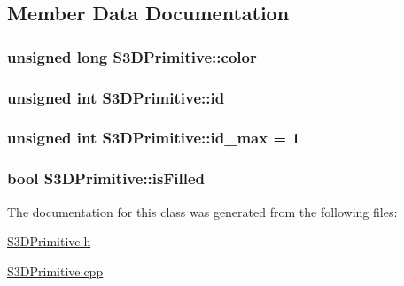 \subsection{Member Data Documentation}
\hypertarget{class_s3_d_primitive_afc81699d5253aab2757a2c5e33848a22}{
\subsubsection[{color}]{\setlength{\rightskip}{0pt plus 5cm}unsigned long {\bf S3DPrimitive::color}}}
\label{class_s3_d_primitive_afc81699d5253aab2757a2c5e33848a22}
\hypertarget{class_s3_d_primitive_ae8ff735495c481dbbd0c99ffe16d954f}{
\subsubsection[{id}]{\setlength{\rightskip}{0pt plus 5cm}unsigned int {\bf S3DPrimitive::id}}}
\label{class_s3_d_primitive_ae8ff735495c481dbbd0c99ffe16d954f}
\hypertarget{class_s3_d_primitive_a08ee26517002051f19202d8b62bf2b46}{
\subsubsection[{id\_\-max}]{\setlength{\rightskip}{0pt plus 5cm}unsigned int {\bf S3DPrimitive::id\_\-max} = 1}}
\label{class_s3_d_primitive_a08ee26517002051f19202d8b62bf2b46}
\hypertarget{class_s3_d_primitive_ae5b091719cc1afa825a4ba0e1dfce670}{
\subsubsection[{isFilled}]{\setlength{\rightskip}{0pt plus 5cm}bool {\bf S3DPrimitive::isFilled}}}
\label{class_s3_d_primitive_ae5b091719cc1afa825a4ba0e1dfce670}


The documentation for this class was generated from the following files:\begin{DoxyCompactItemize}
\item 
\hyperlink{_s3_d_primitive_8h}{S3DPrimitive.h}\item 
\hyperlink{_s3_d_primitive_8cpp}{S3DPrimitive.cpp}\end{DoxyCompactItemize}
